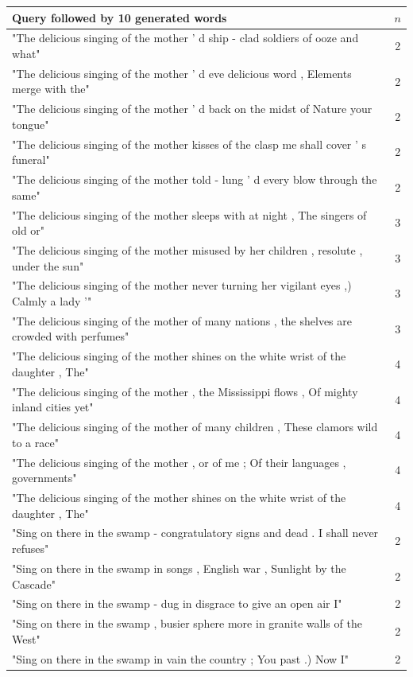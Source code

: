 \documentclass[a4paper,12pt]{article}
\begin{document}
\begin{table}
\begin{tabular}{| l |c|}
\hline
Query followed by 10 generated words & $n$ \\ \hline
"The delicious singing of the mother ' d ship - clad soldiers of ooze and what" & 2\\ \hline
"The delicious singing of the mother ' d eve delicious word , Elements merge with the"& 2 \\ \hline
"The delicious singing of the mother ' d back on the midst of Nature your tongue" & 2 \\ \hline
"The delicious singing of the mother kisses of the clasp me shall cover ' s funeral" & 2 \\ \hline
"The delicious singing of the mother told - lung ' d every blow through the same" & 2 \\ \hline

"The delicious singing of the mother sleeps with at night , The singers of old or" & 3 \\ \hline
"The delicious singing of the mother misused by her children , resolute , under the sun" & 3 \\ \hline
"The delicious singing of the mother never turning her vigilant eyes ,) Calmly a lady '" & 3 \\ \hline
"The delicious singing of the mother of many nations , the shelves are crowded with perfumes" & 3 \\ \hline

"The delicious singing of the mother shines on the white wrist of the daughter , The" & 4 \\ \hline
"The delicious singing of the mother , the Mississippi flows , Of mighty inland cities yet" & 4 \\ \hline
"The delicious singing of the mother of many children , These clamors wild to a race" & 4 \\ \hline
"The delicious singing of the mother , or of me ; Of their languages , governments" & 4 \\ \hline
"The delicious singing of the mother shines on the white wrist of the daughter , The" & 4 \\ \hline

"Sing on there in the swamp - congratulatory signs and dead . I shall never refuses" & 2\\ \hline
"Sing on there in the swamp in songs , English war , Sunlight by the Cascade"& 2 \\ \hline
"Sing on there in the swamp - dug in disgrace to give an open air I" & 2 \\ \hline
"Sing on there in the swamp , busier sphere more in granite walls of the West" & 2 \\ \hline
"Sing on there in the swamp in vain the country ; You past .) Now I" & 2 \\ \hline


\end{tabular}
\end{table}
\end{document}
